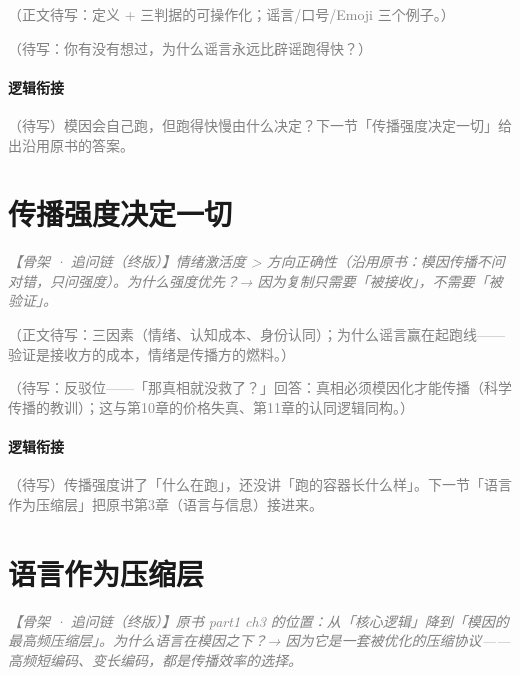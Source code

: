 \documentclass[../../main2.tex]{subfiles}
\begin{document}
	\textcolor{gray}{（正文待写：定义 + 三判据的可操作化；谣言/口号/Emoji 三个例子。）}

	\begin{readingnote}
		\textcolor{gray}{（待写：你有没有想过，为什么谣言永远比辟谣跑得快？）}
	\end{readingnote}

	\paragraph*{逻辑衔接}
	\textcolor{gray}{（待写）模因会自己跑，但跑得快慢由什么决定？下一节「传播强度决定一切」给出沿用原书的答案。}

	\section{传播强度决定一切}
	\label{sec:meme-intensity}

	\textcolor{gray}{\textit{【骨架 · 追问链（终版）】情绪激活度 > 方向正确性（沿用原书：模因传播不问对错，只问强度）。为什么强度优先？→ 因为复制只需要「被接收」，不需要「被验证」。}}

	\textcolor{gray}{（正文待写：三因素（情绪、认知成本、身份认同）；为什么谣言赢在起跑线——验证是接收方的成本，情绪是传播方的燃料。）}

	\begin{questionbox}
		\textcolor{gray}{（待写：反驳位——「那真相就没救了？」回答：真相必须模因化才能传播（科学传播的教训）；这与第10章的价格失真、第11章的认同逻辑同构。）}
	\end{questionbox}

	\paragraph*{逻辑衔接}
	\textcolor{gray}{（待写）传播强度讲了「什么在跑」，还没讲「跑的容器长什么样」。下一节「语言作为压缩层」把原书第3章（语言与信息）接进来。}

	\section{语言作为压缩层}
	\label{sec:meme-language}

	\textcolor{gray}{\textit{【骨架 · 追问链（终版）】原书 part1 ch3 的位置：从「核心逻辑」降到「模因的最高频压缩层」。为什么语言在模因之下？→ 因为它是一套被优化的压缩协议——高频短编码、变长编码，都是传播效率的选择。}}
\end{document}
